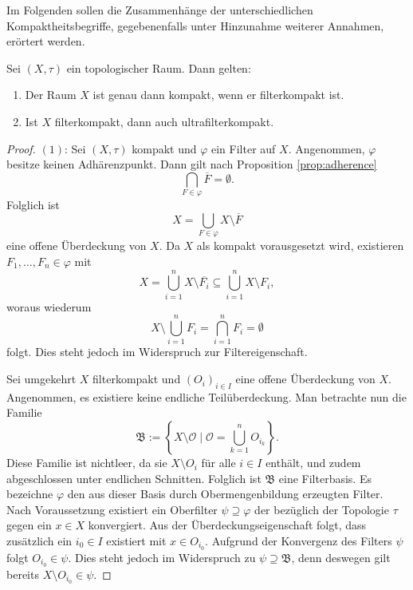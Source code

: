 Im Folgenden sollen die Zusammenhänge der unterschiedlichen Kompaktheitsbegriffe, gegebenenfalls unter Hinzunahme weiterer Annahmen, erörtert werden.

\begin{thm}
\label{thm:compactness}
  Sei $(X,\tau)$ ein topologischer Raum. Dann gelten:
  \begin{enumerate}[(1)]
    \item Der Raum $X$ ist genau dann kompakt, wenn er filterkompakt ist. 
    \item Ist $X$ filterkompakt, dann auch ultrafilterkompakt.
  \end{enumerate}
\end{thm}

\begin{proof}
  $(1)$: 
  Sei $(X,\tau)$ kompakt und $\varphi$ ein Filter auf $X$.
  Angenommen, $\varphi$ besitze keinen Adhärenzpunkt.
  Dann gilt nach Proposition \ref{prop:adherence}
  \begin{displaymath}
    \bigcap_{F \in \varphi} \overline{F} = \emptyset.
  \end{displaymath}
  Folglich ist 
  \begin{displaymath}
    X = \bigcup_{F \in \varphi} X \setminus \overline{F} 
  \end{displaymath}
  eine offene Überdeckung von $X$.
  Da $X$ als kompakt vorausgesetzt wird, existieren $F_1,\allowbreak \dots , F_n \in \varphi$ mit
  \begin{displaymath}
    X = \bigcup_{i = 1}^n X \setminus \overline{F_i} \subseteq \bigcup_{i = 1}^n X \setminus F_i,
  \end{displaymath}
  woraus wiederum
  \begin{displaymath}
    X \setminus \bigcup_{i = 1}^n F_i = \bigcap_{i = 1}^n F_i = \emptyset
  \end{displaymath}
  folgt. 
  Dies steht jedoch im Widerspruch zur Filtereigenschaft.

  Sei umgekehrt $X$ filterkompakt und $(O_i)_{i \in I}$ eine offene Überdeckung von $X$.
  Angenommen, es existiere keine endliche Teilüberdeckung.
  Man betrachte nun die Familie
  \begin{displaymath}
    \mathfrak{B} := \left\{ X \setminus \mathcal{O} \mid \mathcal{O} = \bigcup_{k = 1}^n O_{i_k}\right\}.
  \end{displaymath}
  Diese Familie ist nichtleer, da sie $X \setminus O_i$ für alle $i \in I$ enthält, und zudem abgeschlossen unter endlichen Schnitten.
  Folglich ist $\mathfrak{B}$ eine Filterbasis.
  Es bezeichne $\varphi$ den aus dieser Basis durch Obermengenbildung erzeugten Filter.
  Nach Voraussetzung existiert ein Oberfilter $\psi \supseteq \varphi$ der bezüglich der Topologie $\tau$ gegen ein $x \in X$ konvergiert.
  Aus der Überdeckungseigenschaft folgt, dass zusätzlich ein $i_0 \in I$ existiert mit $x \in O_{i_0}$.
  Aufgrund der Konvergenz des Filters $\psi$ folgt $O_{i_0} \in \psi$.
  Dies steht jedoch im Widerspruch zu $\psi \supseteq \mathfrak{B}$, denn deswegen gilt bereits $X \setminus O_{i_0} \in \psi$.


\end{proof}
